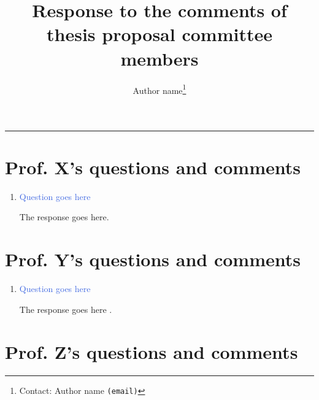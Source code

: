 \documentclass[12pt]{article}
\title{\vspace{-0.75in}\large{Response to the comments of thesis proposal committee members}}
\author[]{Author name\footnote{Contact: Author name \texttt{(email)}}}
\affil[]{Affiliation goes here}
\numberwithin{equation}{section}
\newcommand{\question}{\textcolor{RoyalBlue}}
\begin{document}
\date{}
\maketitle 
\vspace{-0.5cm} \hrule



\section{Prof. X's questions and comments}

\begin{enumerate} [label=\textcolor{RoyalBlue}{\arabic*.},leftmargin= 0.75 cm, itemsep=10pt,parsep=6pt]

\item \question{Question goes here}

The response goes here.



\end{enumerate}






\newpage
\section{Prof. Y's questions and comments}

\begin{enumerate} [label=\textcolor{RoyalBlue}{\arabic*.},leftmargin= 0.75 cm, itemsep=10pt,parsep=6pt]

\item \question{Question goes here}

The response goes here \cite{einstein}.


\end{enumerate}







\newpage
\section{Prof. Z's questions and comments}
\end{document}
